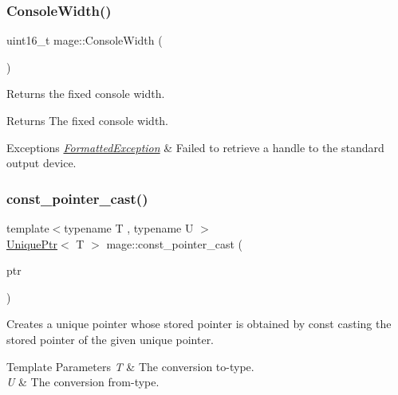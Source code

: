 \subsubsection{\texorpdfstring{Console\+Width()}{ConsoleWidth()}}
{\footnotesize\ttfamily uint16\+\_\+t mage\+::\+Console\+Width (\begin{DoxyParamCaption}{ }\end{DoxyParamCaption})}

Returns the fixed console width.

\begin{DoxyReturn}{Returns}
The fixed console width. 
\end{DoxyReturn}

\begin{DoxyExceptions}{Exceptions}
{\em \hyperlink{structmage_1_1_formatted_exception}{Formatted\+Exception}} & Failed to retrieve a handle to the standard output device. \\
\hline
\end{DoxyExceptions}
\hypertarget{namespacemage_a42610c173d3887debce8bd9750b02684}{}\label{namespacemage_a42610c173d3887debce8bd9750b02684} 
\subsubsection{\texorpdfstring{const\+\_\+pointer\+\_\+cast()}{const\_pointer\_cast()}}
{\footnotesize\ttfamily template$<$typename T , typename U $>$ \\
\hyperlink{namespacemage_a8c307fbcc33bce9b7f2aa4c26c3b95cf}{Unique\+Ptr}$<$ T $>$ mage\+::const\+\_\+pointer\+\_\+cast (\begin{DoxyParamCaption}\item[{\hyperlink{namespacemage_a8c307fbcc33bce9b7f2aa4c26c3b95cf}{Unique\+Ptr}$<$ U $>$ \&\&}]{ptr }\end{DoxyParamCaption})}

Creates a unique pointer whose stored pointer is obtained by const casting the stored pointer of the given unique pointer.


\begin{DoxyTemplParams}{Template Parameters}
{\em T} & The conversion to-\/type. \\
\hline
{\em U} & The conversion from-\/type. \\
\hline
\end{DoxyTemplParams}

